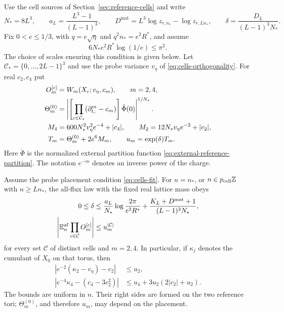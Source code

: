 Use the cell sources of Section~\ref{sec:reference-cells}
and write
\[
 N_*=8L^3,\qquad
 a_L=\frac{L^3-1}{(L-1)^3},\qquad
 D^{\mathrm{mat}}=L^3\log z_{r,n_*}-\log z_{r,Ln_*},
 \qquad
 \delta=\frac{D_L}{(L-1)^3N_*}.
\]
Fix $0<e\le1/3$, with $q=e\sqrt\eta$ and
$q^2n_*=e^2R^*$, and assume
\begin{equation}\label{eq:transfer-W3}
 6N_*e^2R^*\log(1/e)\le\pi^2.
\end{equation}
The choice of scales ensuring this condition is given
below. Let $\mathcal C_*=\{0,\ldots,2L-1\}^3$
and use the probe variance $v_\eta$ of
\eqref{eq:cells-orthogonality}. For real $c_2,c_4$ put
\begin{align}
 O_m^{[c]}&=W_m(X_c;v_\eta,c_m),\qquad m=2,4,
                                      \label{eq:transfer-Wick-observable}\\
 \Theta_m^{(0)}
  &=\left|
      \left[\prod_{c\in\mathcal C_*}
            (\partial_{t_c}^m-c_m)\right]\mathring\Phi(0)
    \right|^{1/N_*}.                  \label{eq:transfer-Theta}\\
 M_4&=600N_*^2v_\eta^2e^{-4}+|c_4|,\qquad
 M_2=12N_*v_\eta e^{-2}+|c_2|,\notag\\
 T_m&=\Theta_m^{(0)}+2e^6M_m,\qquad
 u_m=\exp(\delta)T_m.                 \label{eq:transfer-Wick-data}
\end{align}
Here $\mathring\Phi$ is the normalized external partition
function \eqref{eq:external-reference-partition}.
The notation $e^{-m}$ denotes an inverse power of the
charge.

\begin{proposition}\label{prop:transfer-Wick}
Assume the probe placement condition \eqref{eq:cells-fit}.
For $n=n_*$, or $n\in p_{\rm cell}\mathbb Z$ with $n\ge Ln_*$,
the all-flux law with the fixed real lattice mass obeys
\begin{align}
 0\le\delta
 &\le\frac{a_L}{N_*}\log\frac{2\pi}{e^2R^*}
       +\frac{K_L+D^{\mathrm{mat}}+1}{(L-1)^3N_*},
                                           \label{eq:transfer-delta}\\
 \left|\mathbb E_n^{\mathrm{af}}\prod_{c\in\mathcal C}
                        O_m^{[c]}\right|
 &\le u_m^{|\mathcal C|}              \label{eq:transfer-Wick-product}
\end{align}
for every set $\mathcal C$ of distinct cells and $m=2,4$.
In particular, if $\kappa_j$ denotes the cumulant of
$X_0$ on that torus, then
\begin{align}
 \left|e^{-2}(\kappa_2-v_\eta)-c_2\right|&\le u_2,
                                      \label{eq:transfer-second-cumulant}\\
 \left|e^{-4}\kappa_4-(c_4-3c_2^2)\right|
   &\le u_4+3u_2(2|c_2|+u_2).        \label{eq:transfer-fourth-cumulant}
\end{align}
The bounds are uniform in $n$.
Their right sides are formed on the two reference tori;
$\Theta_m^{(0)}$, and therefore $u_m$, may depend on
the placement.
\end{proposition}

